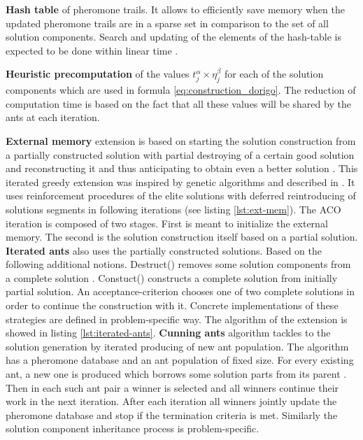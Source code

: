 \documentclass[11pt,a4paper,oneside]{book}
\begin{document}
\textbf{Hash table} of pheromone trails. It allows to efficiently save memory when the updated pheromone trails are in a sparse set in comparison to the set of all solution components. Search and updating of the elements of the hash-table is expected to be done within linear time \cite{hash_table}.

\textbf{Heuristic precomputation} of the values $t_j^\alpha \times \eta_j^\beta$ for each of the solution components which are used in formula \eqref{eq:construction_dorigo}. The reduction of computation time is based on the fact that all these values will be shared by the ants at each iteration.

\textbf{External memory} extension is based on starting the solution construction from a partially constructed solution with partial destroying of a certain good solution and reconstructing it and thus anticipating to obtain even a better solution \cite{iterated_greedy}. This iterated greedy extension was inspired by genetic algorithms and described in \cite{external_memory}. It uses reinforcement procedures of the elite solutions with deferred reintroducing of solutions segments in following iterations (see listing \ref{lst:ext-mem}). The ACO iteration is composed of two stages. First is meant to initialize the external memory. The second is the solution construction itself based on a partial solution. \textbf{Iterated ants} also uses the partially constructed solutions. Based on the following additional notions. Destruct() removes some solution components from a complete solution \cite{iterated_ants}. Constuct() constructs a complete solution from initially partial solution. An acceptance-criterion chooses one of two complete solutions in order to continue the construction with it. Concrete implementations of these strategies are defined in problem-specific way. The algorithm of the extension is showed in listing \ref{lst:iterated-ants}. \textbf{Cunning ants} algorithm tackles to the solution generation by iterated producing of new ant population. The algorithm has a pheromone database and an ant population of fixed size. For every existing ant, a new one is produced which borrows some solution parts from its parent \cite{cunning_ants}. Then in each such ant pair a winner is selected and all winners continue their work in the next iteration. After each iteration all winners jointly update the pheromone database and stop if the termination criteria is met. Similarly the solution component inheritance process is problem-specific. 
\end{document}
